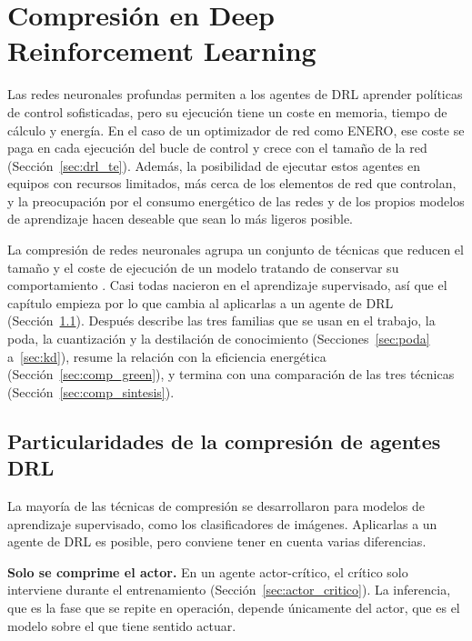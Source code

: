 \chapter{Compresión en Deep Reinforcement Learning}\label{cap:comp}

Las redes neuronales profundas permiten a los agentes de DRL aprender políticas de control sofisticadas, pero su ejecución tiene un coste en memoria, tiempo de cálculo y energía. En el caso de un optimizador de red como ENERO, ese coste se paga en cada ejecución del bucle de control y crece con el tamaño de la red (Sección~\ref{sec:drl_te}). Además, la posibilidad de ejecutar estos agentes en equipos con recursos limitados, más cerca de los elementos de red que controlan, y la preocupación por el consumo energético de las redes y de los propios modelos de aprendizaje hacen deseable que sean lo más ligeros posible.

La compresión de redes neuronales agrupa un conjunto de técnicas que reducen el tamaño y el coste de ejecución de un modelo tratando de conservar su comportamiento \cite{han2016deep}. Casi todas nacieron en el aprendizaje supervisado, así que el capítulo empieza por lo que cambia al aplicarlas a un agente de DRL (Sección~\ref{sec:comp_part}). Después describe las tres familias que se usan en el trabajo, la poda, la cuantización y la destilación de conocimiento (Secciones~\ref{sec:poda} a~\ref{sec:kd}), resume la relación con la eficiencia energética (Sección~\ref{sec:comp_green}), y termina con una comparación de las tres técnicas (Sección~\ref{sec:comp_sintesis}).

\section{Particularidades de la compresión de agentes DRL}\label{sec:comp_part}

La mayoría de las técnicas de compresión se desarrollaron para modelos de aprendizaje supervisado, como los clasificadores de imágenes. Aplicarlas a un agente de DRL es posible, pero conviene tener en cuenta varias diferencias.

\textbf{Solo se comprime el actor.} En un agente actor-crítico, el crítico solo interviene durante el entrenamiento (Sección~\ref{sec:actor_critico}). La inferencia, que es la fase que se repite en operación, depende únicamente del actor, que es el modelo sobre el que tiene sentido actuar.

